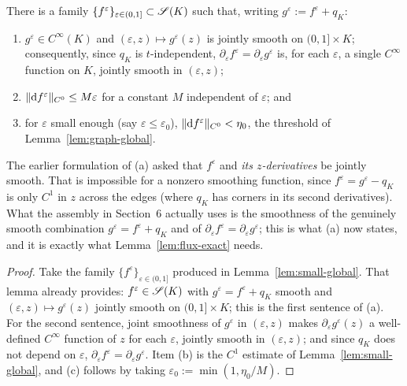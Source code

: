 \begin{qeightlemma}\label{lem:cont-family}
There is a family $\{f^\varepsilon\}_{\varepsilon\in(0,1]}\subset\mathscr S(K)$ such
that, writing $g^\varepsilon:=f^\varepsilon+q_K$:
\begin{enumerate}[label=\textup{(\alph*)}]
\item $g^\varepsilon\in C^\infty(K)$ and $(\varepsilon,z)\mapsto g^\varepsilon(z)$
is jointly smooth on $(0,1]\times K$; consequently, since $q_K$ is
$t$-independent, $\partial_\varepsilon f^\varepsilon=\partial_\varepsilon g^\varepsilon$
is, for each $\varepsilon$, a single $C^\infty$ function on $K$, jointly smooth in
$(\varepsilon,z)$;
\item $\|\mathrm d f^\varepsilon\|_{C^0}\le M\varepsilon$ for a constant $M$ independent
of $\varepsilon$; and
\item for $\varepsilon$ small enough (say $\varepsilon\le\varepsilon_0$),
$\|\mathrm d f^\varepsilon\|_{C^0}<\eta_0$, the threshold of
Lemma~\ref{lem:graph-global}.
\end{enumerate}
\end{qeightlemma}

\begin{qeightremark}
The earlier formulation of (a) asked that $f^\varepsilon$ and \emph{its
$z$-derivatives} be jointly smooth. That is impossible for a nonzero smoothing
function, since $f^\varepsilon=g^\varepsilon-q_K$ is only $C^1$ in $z$ across the
edges (where $q_K$ has corners in its second derivatives). What the assembly in
Section~6 actually uses is the smoothness of the genuinely smooth combination
$g^\varepsilon=f^\varepsilon+q_K$ and of $\partial_\varepsilon f^\varepsilon=
\partial_\varepsilon g^\varepsilon$; this is what (a) now states, and it is exactly
what Lemma~\ref{lem:flux-exact} needs.
\end{qeightremark}

\begin{proof}
Take the family $\{f^\varepsilon\}_{\varepsilon\in(0,1]}$ produced in
Lemma~\ref{lem:small-global}. That lemma already provides: $f^\varepsilon\in\mathscr S(K)$
with $g^\varepsilon=f^\varepsilon+q_K$ smooth and $(\varepsilon,z)\mapsto
g^\varepsilon(z)$ jointly smooth on $(0,1]\times K$; this is the first sentence of
(a). For the second sentence, joint smoothness of $g^\varepsilon$ in $(\varepsilon,z)$
makes $\partial_\varepsilon g^\varepsilon(z)$ a well-defined $C^\infty$ function of
$z$ for each $\varepsilon$, jointly smooth in $(\varepsilon,z)$; and since $q_K$ does
not depend on $\varepsilon$, $\partial_\varepsilon f^\varepsilon=\partial_\varepsilon
g^\varepsilon$. Item (b) is the $C^1$ estimate of Lemma~\ref{lem:small-global}, and
(c) follows by taking $\varepsilon_0:=\min(1,\eta_0/M)$.
\end{proof}


